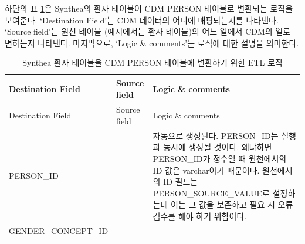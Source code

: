 \documentclass[10.5pt]{book}
\theoremstyle{definition}
\theoremstyle{definition}
\theoremstyle{definition}
\theoremstyle{remark}
\begin{document}
하단의 표 \ref{tab:syntheaEtlPerson}은 Synthea의 환자 테이블이 CDM
PERSON 테이블로 변환되는 로직을 보여준다. `Destination Field'는 CDM
데이터의 어디에 매핑되는지를 나타낸다. `Source field'는 원천 테이블
(예시에서는 환자 테이블)의 어느 열에서 CDM의 열로 변하는지 나타낸다.
마지막으로, `Logic \& comments'는 로직에 대한 설명을 의미한다.

\begin{longtable}[]{@{}lll@{}}
\caption{\label{tab:syntheaEtlPerson} Synthea 환자 테이블을 CDM PERSON
테이블에 변환하기 위한 ETL 로직}\tabularnewline
\toprule
\begin{minipage}[b]{0.28\columnwidth}\raggedright\strut
Destination Field\strut
\end{minipage} & \begin{minipage}[b]{0.13\columnwidth}\raggedright\strut
Source field\strut
\end{minipage} & \begin{minipage}[b]{0.50\columnwidth}\raggedright\strut
Logic \& comments\strut
\end{minipage}\tabularnewline
\midrule
\endfirsthead
\toprule
\begin{minipage}[b]{0.28\columnwidth}\raggedright\strut
Destination Field\strut
\end{minipage} & \begin{minipage}[b]{0.13\columnwidth}\raggedright\strut
Source field\strut
\end{minipage} & \begin{minipage}[b]{0.50\columnwidth}\raggedright\strut
Logic \& comments\strut
\end{minipage}\tabularnewline
\midrule
\endhead
\begin{minipage}[t]{0.28\columnwidth}\raggedright\strut
PERSON\_ID\strut
\end{minipage} & \begin{minipage}[t]{0.13\columnwidth}\raggedright\strut
\strut
\end{minipage} & \begin{minipage}[t]{0.50\columnwidth}\raggedright\strut
자동으로 생성된다. PERSON\_ID는 실행과 동시에 생성될 것이다. 왜냐하면
PERSON\_ID가 정수일 때 원천에서의 ID 값은 varchar이기 때문이다.
원천에서의 ID 필드는 PERSON\_SOURCE\_VALUE로 설정하는데 이는 그 값을
보존하고 필요 시 오류 검수를 해야 하기 위함이다.\strut
\end{minipage}\tabularnewline
\begin{minipage}[t]{0.28\columnwidth}\raggedright\strut
GENDER\_CONCEPT\_ID\strut
\end{minipage} & \begin{minipage}[t]{0.13\columnwidth}\raggedright\strut

\end{minipage}
\end{longtable}
\end{document}
